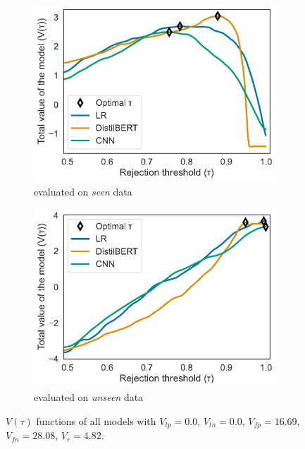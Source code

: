 \begin{figure}
    \centering
    \begin{subfigure}{.49\textwidth}
        \centering
        \includegraphics[scale=.4]{Figures/metric-tptn0-seen-data.pdf}
        \caption{evaluated on \emph{seen} data}
    \end{subfigure}
    \begin{subfigure}{.49\textwidth}
        \centering
        \includegraphics[scale=.4]{Figures/metric-tptn0-unseen-data.pdf}
        \caption{evaluated on \emph{unseen} data}
    \end{subfigure}
    \caption{$V(\tau)$ functions of all models with $V_{tp} = 0.0$, $V_{tn} = 0.0$, $V_{fp} = 16.69$, $V_{fn} = 28.08$, $V_r = 4.82$.}
    \label{fig:metric-plots-tptn0}
\end{figure}

